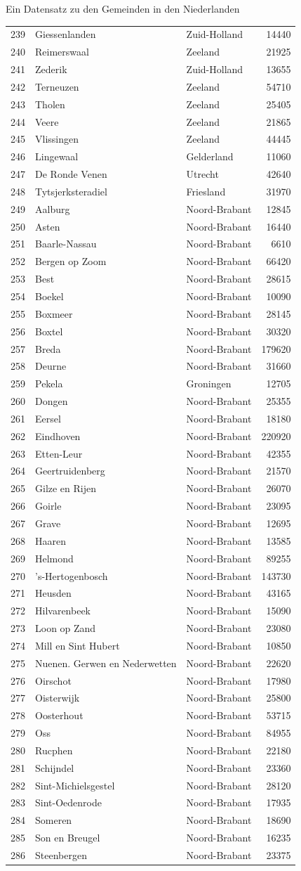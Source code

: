 \documentclass[ignorenonframetext,]{beamer}
\begin{document}
\begin{frame}[fragile]{Ein Datensatz zu den Gemeinden in den
Niederlanden}
\begin{longtable}[]{@{}lllr@{}}
239 & Giessenlanden & Zuid-Holland & 14440\tabularnewline
240 & Reimerswaal & Zeeland & 21925\tabularnewline
241 & Zederik & Zuid-Holland & 13655\tabularnewline
242 & Terneuzen & Zeeland & 54710\tabularnewline
243 & Tholen & Zeeland & 25405\tabularnewline
244 & Veere & Zeeland & 21865\tabularnewline
245 & Vlissingen & Zeeland & 44445\tabularnewline
246 & Lingewaal & Gelderland & 11060\tabularnewline
247 & De Ronde Venen & Utrecht & 42640\tabularnewline
248 & Tytsjerksteradiel & Friesland & 31970\tabularnewline
249 & Aalburg & Noord-Brabant & 12845\tabularnewline
250 & Asten & Noord-Brabant & 16440\tabularnewline
251 & Baarle-Nassau & Noord-Brabant & 6610\tabularnewline
252 & Bergen op Zoom & Noord-Brabant & 66420\tabularnewline
253 & Best & Noord-Brabant & 28615\tabularnewline
254 & Boekel & Noord-Brabant & 10090\tabularnewline
255 & Boxmeer & Noord-Brabant & 28145\tabularnewline
256 & Boxtel & Noord-Brabant & 30320\tabularnewline
257 & Breda & Noord-Brabant & 179620\tabularnewline
258 & Deurne & Noord-Brabant & 31660\tabularnewline
259 & Pekela & Groningen & 12705\tabularnewline
260 & Dongen & Noord-Brabant & 25355\tabularnewline
261 & Eersel & Noord-Brabant & 18180\tabularnewline
262 & Eindhoven & Noord-Brabant & 220920\tabularnewline
263 & Etten-Leur & Noord-Brabant & 42355\tabularnewline
264 & Geertruidenberg & Noord-Brabant & 21570\tabularnewline
265 & Gilze en Rijen & Noord-Brabant & 26070\tabularnewline
266 & Goirle & Noord-Brabant & 23095\tabularnewline
267 & Grave & Noord-Brabant & 12695\tabularnewline
268 & Haaren & Noord-Brabant & 13585\tabularnewline
269 & Helmond & Noord-Brabant & 89255\tabularnewline
270 & 's-Hertogenbosch & Noord-Brabant & 143730\tabularnewline
271 & Heusden & Noord-Brabant & 43165\tabularnewline
272 & Hilvarenbeek & Noord-Brabant & 15090\tabularnewline
273 & Loon op Zand & Noord-Brabant & 23080\tabularnewline
274 & Mill en Sint Hubert & Noord-Brabant & 10850\tabularnewline
275 & Nuenen. Gerwen en Nederwetten & Noord-Brabant &
22620\tabularnewline
276 & Oirschot & Noord-Brabant & 17980\tabularnewline
277 & Oisterwijk & Noord-Brabant & 25800\tabularnewline
278 & Oosterhout & Noord-Brabant & 53715\tabularnewline
279 & Oss & Noord-Brabant & 84955\tabularnewline
280 & Rucphen & Noord-Brabant & 22180\tabularnewline
281 & Schijndel & Noord-Brabant & 23360\tabularnewline
282 & Sint-Michielsgestel & Noord-Brabant & 28120\tabularnewline
283 & Sint-Oedenrode & Noord-Brabant & 17935\tabularnewline
284 & Someren & Noord-Brabant & 18690\tabularnewline
285 & Son en Breugel & Noord-Brabant & 16235\tabularnewline
286 & Steenbergen & Noord-Brabant & 23375\tabularnewline

\end{longtable}
\end{frame}
\end{document}
